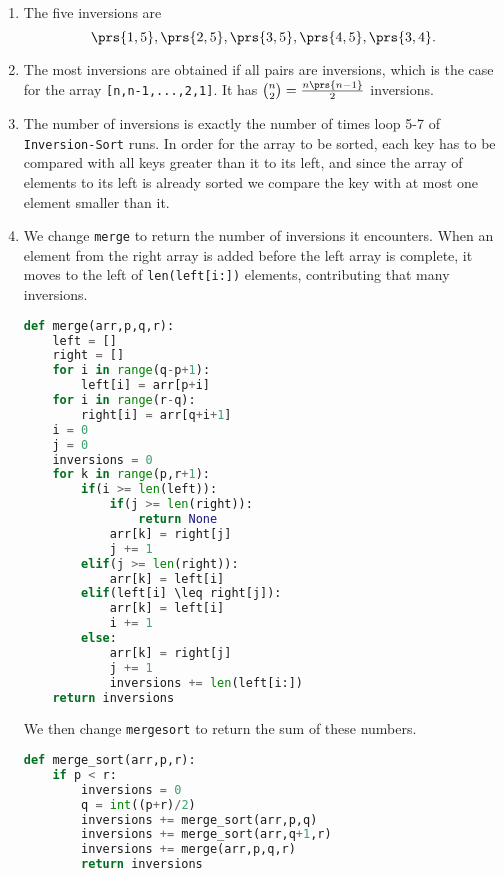 \documentclass[oneside]{scrbook}
\newcommand{\codeword}[1]{\texttt{#1}}
\theoremstyle{definition}
\begin{document}
\begin{problem}[Inversions]
\begin{enumerate}[label = \alph*.]
\item
The five inversions are
\[\prs{1,5}, \prs{2,5}, \prs{3,5}, \prs{4,5}, \prs{3,4} \text{.}\]

\item
The most inversions are obtained if all pairs are inversions, which is the case for the array \codeword{[n,n-1,...,2,1]}. It has $\binom{n}{2} = \frac{n\prs{n-1}}{2}$ inversions.

\item
The number of inversions is exactly the number of times loop 5-7 of \codeword{Inversion-Sort} runs. In order for the array to be sorted, each key has to be compared with all keys greater than it to its left, and since the array of elements to its left is already sorted we compare the key with at most one element smaller than it.

\item
We change \codeword{merge} to return the number of inversions it encounters. When an element from the right array is added before the left array is complete, it moves to the left of \codeword{len(left[i:])} elements, contributing that many inversions.

\begin{lstlisting}[language=Python]
def merge(arr,p,q,r):
	left = []
	right = []
	for i in range(q-p+1):
		left[i] = arr[p+i]
	for i in range(r-q):
		right[i] = arr[q+i+1]
	i = 0
	j = 0
	inversions = 0
	for k in range(p,r+1):
		if(i >= len(left)):
			if(j >= len(right)):
				return None
			arr[k] = right[j]
			j += 1		
		elif(j >= len(right)):
			arr[k] = left[i]		
		elif(left[i] \leq right[j]):
			arr[k] = left[i]
			i += 1
		else:
			arr[k] = right[j]
			j += 1
			inversions += len(left[i:])
	return inversions
\end{lstlisting}

We then change \codeword{merge\textunderscore{}sort} to return the sum of these numbers.

\begin{lstlisting}[language=Python]
def merge_sort(arr,p,r):
	if p < r:
		inversions = 0
		q = int((p+r)/2)
		inversions += merge_sort(arr,p,q)
		inversions += merge_sort(arr,q+1,r)
		inversions += merge(arr,p,q,r)
		return inversions
\end{lstlisting}
\end{enumerate}
\end{problem}
\end{document}

